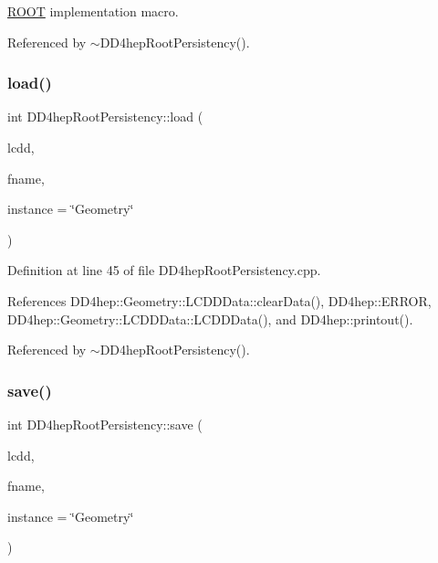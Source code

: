 \hyperlink{namespace_r_o_o_t}{R\+O\+OT} implementation macro. 



Referenced by $\sim$\+D\+D4hep\+Root\+Persistency().

\hypertarget{class_d_d4hep_root_persistency_a01f849c58fac51a46b47bcaf18fb87cf}{}\label{class_d_d4hep_root_persistency_a01f849c58fac51a46b47bcaf18fb87cf} 
\subsubsection{\texorpdfstring{load()}{load()}}
{\footnotesize\ttfamily int D\+D4hep\+Root\+Persistency\+::load (\begin{DoxyParamCaption}\item[{\hyperlink{class_d_d4hep_1_1_geometry_1_1_l_c_d_d}{D\+D4hep\+::\+Geometry\+::\+L\+C\+DD} \&}]{lcdd,  }\item[{const char $\ast$}]{fname,  }\item[{const char $\ast$}]{instance = {\ttfamily \char`\"{}Geometry\char`\"{}} }\end{DoxyParamCaption})\hspace{0.3cm}{\ttfamily [static]}}



Definition at line 45 of file D\+D4hep\+Root\+Persistency.\+cpp.



References D\+D4hep\+::\+Geometry\+::\+L\+C\+D\+D\+Data\+::clear\+Data(), D\+D4hep\+::\+E\+R\+R\+OR, D\+D4hep\+::\+Geometry\+::\+L\+C\+D\+D\+Data\+::\+L\+C\+D\+D\+Data(), and D\+D4hep\+::printout().



Referenced by $\sim$\+D\+D4hep\+Root\+Persistency().

\hypertarget{class_d_d4hep_root_persistency_a29e9e5f5a15dd597278c5960d25c69f3}{}\label{class_d_d4hep_root_persistency_a29e9e5f5a15dd597278c5960d25c69f3} 
\subsubsection{\texorpdfstring{save()}{save()}}
{\footnotesize\ttfamily int D\+D4hep\+Root\+Persistency\+::save (\begin{DoxyParamCaption}\item[{\hyperlink{class_d_d4hep_1_1_geometry_1_1_l_c_d_d}{D\+D4hep\+::\+Geometry\+::\+L\+C\+DD} \&}]{lcdd,  }\item[{const char $\ast$}]{fname,  }\item[{const char $\ast$}]{instance = {\ttfamily \char`\"{}Geometry\char`\"{}} }\end{DoxyParamCaption})\hspace{0.3cm}{\ttfamily [static]}}



